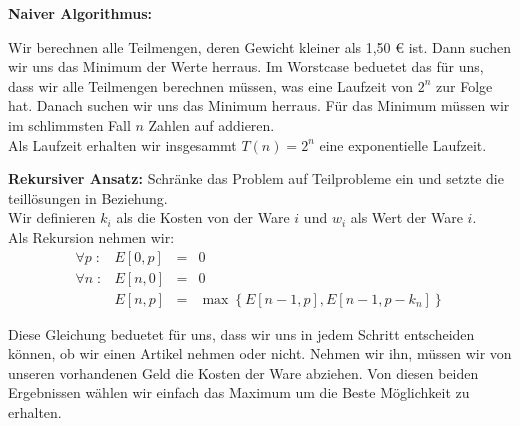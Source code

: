 \begin{description}

\item{\bfseries Naiver Algorithmus:}

Wir berechnen alle Teilmengen, deren Gewicht kleiner als 1,50 \euro{} ist. Dann suchen wir uns das Minimum der Werte herraus. Im Worstcase beduetet das für uns, dass wir alle Teilmengen berechnen müssen, was eine Laufzeit von $2^n$ zur Folge hat. Danach suchen wir uns das Minimum herraus.
Für das Minimum müssen wir im schlimmsten Fall $n$ Zahlen auf addieren.\\

Als Laufzeit erhalten wir insgesammt $T(n) = 2^n$ eine exponentielle Laufzeit.

\item{\bfseries Rekursiver Ansatz:} Schränke das Problem auf Teilprobleme ein und setzte die teillösungen in Beziehung.\\

Wir definieren $k_i$ als die Kosten von der Ware $i$ und $w_i$ als Wert der Ware $i$.\\
Als Rekursion nehmen wir:
$$
\begin{array}{lrcl}
\forall p \; : & E[0,p] & = & 0\\
\forall n \; : & E[n,0]&=& 0\\
&E[n,p] &=& \max \left\{ E[n-1, p] , E[n-1, p - k_n] \right\}
\end{array}
$$

Diese Gleichung beduetet für uns, dass wir uns in jedem Schritt entscheiden können, ob wir einen Artikel nehmen oder nicht. Nehmen wir ihn, müssen wir von unseren vorhandenen Geld die Kosten der Ware abziehen. Von diesen beiden Ergebnissen wählen wir einfach das Maximum um die Beste Möglichkeit zu erhalten.
\end{description}